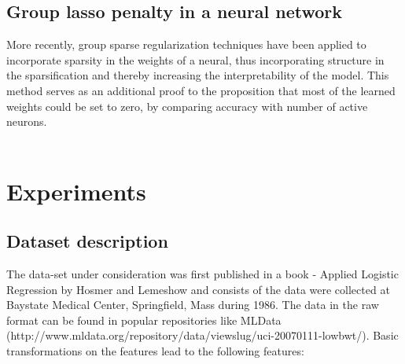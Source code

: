 \documentclass[a4paper,12pt]{article}
\begin{document}
\subsection{Group lasso penalty in a neural network}
More recently, group sparse regularization techniques have been applied to incorporate sparsity in the weights of a neural, thus incorporating structure in the sparsification and thereby increasing the interpretability of the model. This method serves as an additional proof to the proposition that most of the learned weights could be set to zero, by comparing accuracy with number of active neurons. \\ \\





\newpage
\section{Experiments}
	\subsection{Dataset description}
		The data-set under consideration was first published in a book - Applied Logistic Regression by Hosmer and Lemeshow \cite{hosmer2013applied} and consists of the  data were collected at Baystate Medical Center, Springfield, Mass during 1986. The data in the raw format can be found in popular repositories like MLData (http://www.mldata.org/repository/data/viewslug/uci-20070111-lowbwt/). Basic transformations on the features lead to the following features:
    
\end{document}

